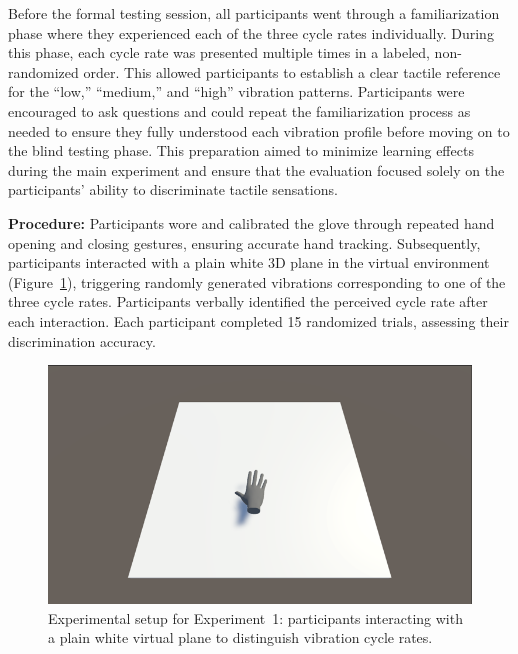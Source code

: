 Before the formal testing session, all participants went through a familiarization phase where they experienced each of the three cycle rates individually. During this phase, each cycle rate was presented multiple times in a labeled, non-randomized order. This allowed participants to establish a clear tactile reference for the “low,” “medium,” and “high” vibration patterns. Participants were encouraged to ask questions and could repeat the familiarization process as needed to ensure they fully understood each vibration profile before moving on to the blind testing phase. This preparation aimed to minimize learning effects during the main experiment and ensure that the evaluation focused solely on the participants' ability to discriminate tactile sensations.

\textbf{Procedure:} Participants wore and calibrated the glove through repeated hand opening and closing gestures, ensuring accurate hand tracking. Subsequently, participants interacted with a plain white 3D plane in the virtual environment (Figure~\ref{fig:experiment1_setup}), triggering randomly generated vibrations corresponding to one of the three cycle rates. Participants verbally identified the perceived cycle rate after each interaction. Each participant completed 15 randomized trials, assessing their discrimination accuracy.

\begin{figure}[H]\centering
	\includegraphics[width=1\textwidth]{Pictures/ex1.png}%
	\caption{Experimental setup for Experiment~1: participants interacting with a plain white virtual plane to distinguish vibration cycle rates.}\label{fig:experiment1_setup}%
	
\end{figure}

\newpage

